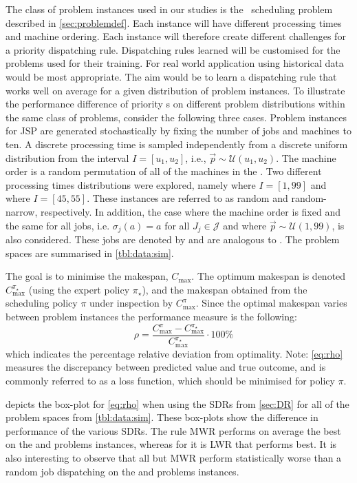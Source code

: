 \documentclass[twocolumn]{svjour3}
\begin{document}
The class of problem instances used in our studies is the \jsp\ scheduling 
problem described in \cref{sec:problemdef}. Each instance will have 
different processing times and machine ordering. Each instance will 
therefore create different challenges for a priority dispatching rule. 
Dispatching rules learned will be customised for the problems used for their 
training. For real world application using historical data would be most 
appropriate. The aim would be to learn a dispatching rule that works well on 
average for a given distribution of problem instances. 
To illustrate the performance difference of priority \dr s on different 
problem distributions within the same class of problems, 
consider the following three cases.
Problem instances for JSP are generated stochastically by fixing the number of 
jobs and machines to ten. A discrete processing time is sampled independently 
from a discrete uniform distribution from the interval $I=[u_1,u_2]$, i.e., 
$\vec{p}\sim \mathcal{U}(u_1,u_2)$. 
The machine order is a random permutation of all of the machines in the 
\jsp. Two different processing times distributions were explored, namely 
 where $I=[1,99]$ and  where $I=[45,55]$. These 
instances are referred to as random and random-narrow, respectively. 
In addition, the case where the machine order is fixed and the same for 
all jobs, i.e. $\sigma_j(a)=a$ for all $J_j\in\mathcal{J}$ and where 
$\vec{p}\sim\mathcal{U}(1,99)$, is also considered. 
These jobs are denoted by  and are analogous to .
The problem spaces are summarised in \cref{tbl:data:sim}.

The goal is to minimise the makespan, $C_{\max}$. The optimum 
makespan is denoted $C_{\max}^{\pi_\star}$ (using the expert policy 
$\pi_\star$), and the makespan obtained from the 
scheduling policy $\pi$ under inspection by $C_{\max}^{\pi}$. Since the optimal 
makespan varies between problem instances the performance measure is the 
following:
\begin{equation}\quad\label{eq:rho}
\rho=\frac{C_{\max}^{\pi}-C_{\max}^{\pi_\star}}{C_{\max}^{\pi_\star}}\cdot
100\%
\end{equation}
which indicates the percentage relative deviation from optimality. 
Note: \cref{eq:rho} measures the discrepancy between predicted value and true 
outcome, and is commonly referred to as a loss function, which should be 
minimised for policy $\pi$.

 depicts the box-plot for \cref{eq:rho} when using the 
SDRs from \cref{sec:DR} for all of the problem spaces from \cref{tbl:data:sim}.
These box-plots show the difference in performance of the various SDRs. The 
rule MWR performs on average the best on the  and  
problems instances, whereas for  it is LWR that performs best. It is 
also interesting to observe that all but MWR perform statistically worse than a 
random job dispatching on the  and  problems instances.
\end{document}
